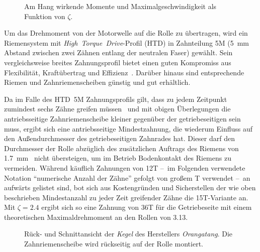 		\begin{figure}[h]
			\centering
			
			\caption[Am Hang wirkende Momente und Maximalgeschwindigkeit als Funktion von \(\zeta\)]{Am Hang wirkende Momente und Maximalgeschwindigkeit als Funktion von \(\zeta\).}%
			\label{fig:torque ratio and vmax vs zetas}
		\end{figure}\par\medskip
		Um das Drehmoment von der Motorwelle auf die Rolle zu übertragen, wird ein Riemensystem mit \textit{High~Torque~Drive}-Profil (HTD) in Zahnteilung 5M (\qty{5}{mm} Abstand zwischen zwei Zähnen entlang der neutralen Faser) gewählt. 
		Sein vergleichsweise breites Zahnungsprofil bietet einen guten Kompromiss aus Flexibilität, Kraftübertrag und Effizienz~\cite{gates.catalogue.2021}.
		Darüber hinaus sind entsprechende Riemen und Zahnriemenscheiben günstig und gut erhältlich.
		
		Da im Falle des HTD~5M Zahnungsprofils gilt, dass zu jedem Zeitpunkt zumindest sechs Zähne greifen müssen~\cite{MAEDLERGmbH.2021} und mit obigen Überlegungen die antriebsseitige Zahnriemenscheibe kleiner gegenüber der getriebeseitigen sein muss, ergibt sich eine antriebsseitige Mindestzahnung, die wiederum Einfluss auf den Außendurchmesser des getriebeseitigen Zahnrades hat.
		Dieser darf den Durchmesser der Rolle abzüglich des zusätzlichen Auftrags des Riemens von \qty{1,7}{\milli\metre}~\cite{gates.catalogue.2021} nicht übersteigen, um im Betrieb Bodenkontakt des Riemens zu vermeiden.
		Während käuflich Zahnungen von 12T --~im Folgenden verwendete Notation ``numerische Anzahl der Zähne'' gefolgt von großem T verwendet --~an aufwärts gelistet sind, bot sich aus Kostengründen und Sicherstellen der wie oben beschrieben Mindestanzahl zu jeder Zeit greifender Zähne die 15T-Variante an.
		Mit \(\zeta = \num{2,4}\) ergibt sich so eine Zahnung von 36T für die Getriebeseite mit einem theoretischen Maximaldrehmoment an den Rollen von \qty{3,13}{\newtonmetre}.
		\begin{figure}[h]
			\centering
			
			\caption[Rück- und Schnittansicht der \textit{Kegel} des Herstellers \textit{Orangatang}]{Rück- und Schnittansicht der \textit{Kegel} des Herstellers \textit{Orangatang}. Die Zahnriemenscheibe wird rückseitig auf der Rolle montiert.}%
			\label{fig:kegels}
		\end{figure}

